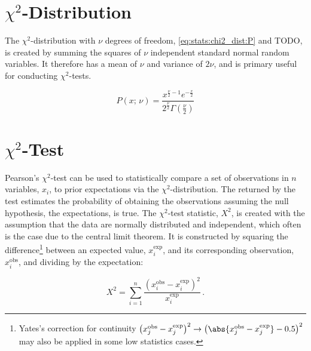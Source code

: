 \section{\texorpdfstring{$\chi^{2}$-Distribution}{Chi-Squared Distribution}}
\label{stats:chi2_dist}

The $\chi^{2}$-distribution with $\nu$ degrees of freedom,
\cref{eq:stats:chi2_dist:P} and TODO,
is created by summing the squares of $\nu$ independent standard normal random variables.
It therefore has a mean of $\nu$ and variance of $2\nu$, and is
primary useful for conducting $\chi^{2}$-tests.

\begin{equation}\label{eq:stats:chi2_dist:P}
P\left(x;\,\nu\right) = \frac{
x^{\frac{\nu}{2} - 1} e^{-\frac{x}{2}}
}{
2^{\frac{\nu}{2}} \Gamma\left(\frac{\nu}{2}\right)}
\end{equation}

\section{\texorpdfstring{$\chi^{2}$-Test}{Chi-Squared Test}}
\label{stats:chi2_test}

Pearson's $\chi^{2}$-test can be used to
statistically compare a set of observations in
$n$ variables, $x_{i}$, to prior expectations via the $\chi^{2}$-distribution.
The \pvalue returned by the test estimates the probability of obtaining the observations
assuming the null hypothesis, \ie the expectations, is true.
The $\chi^{2}$-test statistic, $X^{2}$, is created with the assumption that
the data are normally distributed and independent,
which often is the case due to the central limit theorem.
It is constructed by squaring the difference\footnote{Yates's
correction for continuity $\left(x^{\text{obs}}_{j} - x^{\text{exp}}_{j}\right)^{2} \to \left(\abs{x^{\text{obs}}_{j} - x^{\text{exp}}_{j}}-0.5\right)^{2}$ may
also be applied in some low statistics cases.} between
an expected value, $x^{\text{exp}}_{i}$, and its corresponding observation, $x^{\text{obs}}_{i}$,
and dividing by the expectation:

\begin{equation}\label{eq:stats:chi2_score}
X^{2} = \sum_{i=1}^{n} \frac{\left(x^{\text{obs}}_{i} - x^{\text{exp}}_{i}\right)^{2}}{x^{\text{exp}}_{i}}\,.
\end{equation}

